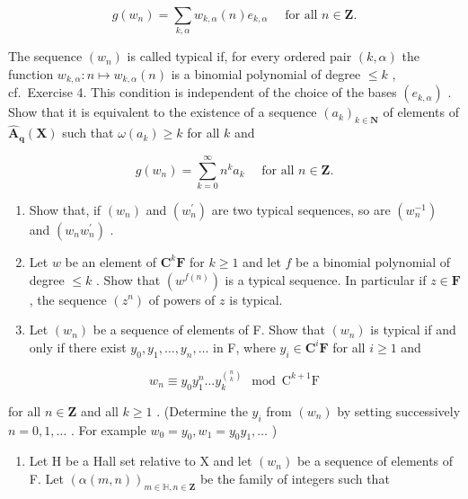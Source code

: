 \[
g (w _ {n}) = \sum_ {k, \alpha} w _ {k, \alpha} (n) e _ {k, \alpha} \quad \text { for   all } n \in \mathbf {Z}.
\]

The sequence \((w_{n})\) is called typical if, for every ordered pair \((k,\alpha)\) the function \(w_{k,\alpha}\colon n\mapsto w_{k,\alpha}(n)\) is a binomial polynomial of degree \(\leqslant k\) , cf.~Exercise 4. This condition is independent of the choice of the bases \((e_{k,\alpha})\) . Show that it is equivalent to the existence of a sequence \((a_{k})_{k\in \mathbf{N}}\) of elements of \(\hat{\mathbf{A}}_{\mathbf{q}}(\mathbf{X})\) such that \(\omega (a_k)\geqslant k\) for all \(k\) and

\[
g (w _ {n}) = \sum_ {k = 0} ^ {\infty} n ^ {k} a _ {k} \quad \text { for   all } n \in \mathbf {Z}.
\]

\begin{enumerate}
\def\labelenumi{(\alph{enumi})}
\setcounter{enumi}{1}
\item
  Show that, if \((w_{n})\) and \((w_{n}^{\prime})\) are two typical sequences, so are \((w_{n}^{-1})\) and \((w_{n}w_{n}^{\prime})\) .
\item
  Let \(w\) be an element of \(\mathbf{C}^k\mathbf{F}\) for \(k \geqslant 1\) and let \(f\) be a binomial polynomial of degree \(\leqslant k\) . Show that \((w^{f(n)})\) is a typical sequence. In particular if \(z \in \mathbf{F}\) , the sequence \((z^n)\) of powers of \(z\) is typical.
\item
  Let \((w_{n})\) be a sequence of elements of F. Show that \((w_{n})\) is typical if and only if there exist \(y_{0}, y_{1}, \ldots, y_{n}, \ldots\) in F, where \(y_{i} \in \mathbf{C}^{i}\mathbf{F}\) for all \(i \geqslant 1\) and
\end{enumerate}

\[
w _ {n} \equiv y _ {0} y _ {1} ^ {n} \dots y _ {k} ^ {\binom {n} {k}} \mod \mathrm{C} ^ {k + 1} \mathrm{F}
\]

for all \(n \in \mathbf{Z}\) and all \(k \geqslant 1\) . (Determine the \(y_{i}\) from \((w_{n})\) by setting successively \(n = 0, 1, \ldots\) . For example \(w_{0} = y_{0}, w_{1} = y_{0}y_{1}, \ldots\) )

\begin{enumerate}
\def\labelenumi{(\alph{enumi})}
\setcounter{enumi}{4}
\tightlist
\item
  Let H be a Hall set relative to X and let \((w_{n})\) be a sequence of elements of F. Let \((\alpha(m,n))_{m\in\mathbb{H},n\in\mathbf{Z}}\) be the family of integers such that
\end{enumerate}

